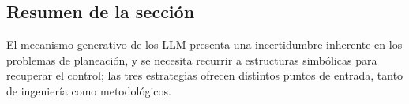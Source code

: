 \subsection{Resumen de la sección}

El mecanismo generativo de los LLM presenta una incertidumbre inherente en los problemas de planeación, y se necesita recurrir a estructuras simbólicas para recuperar el control; las tres estrategias ofrecen distintos puntos de entrada, tanto de ingeniería como metodológicos.

